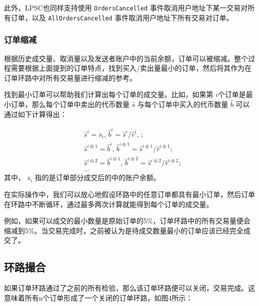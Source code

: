 \documentclass[UTF8]{ctexart}
\makeatletter
\newenvironment{figurehere}
 {\def\@captype{figure}}
 {}
\makeatother
\begin{document}
\begin{multicols}{2}
此外，LPSC也同样支持使用 \verb|OrdersCancelled| 事件取消用户地址下某一交易对所有订单，以及 \verb|AllOrdersCancelled| 事件取消用户地址下所有交易对订单。


\subsubsection{订单缩减\label{sec:order_scaling}}
根据历史成交量、取消量以及发送者账户中的当前余额，订单可以被缩减。整个过程需要根据上面提到的订单特点，找到买入/卖出量最小的订单，然后将其作为在订单环路中对所有交易量进行缩减的参考。

找到最小订单可以帮助我们计算出每个订单的成交量。比如，如果第 $i$个订单是最小订单，那么每个订单中卖出的代币数量 $\hat{s}$ 与每个订单中买入的代币数量 $\hat{b}$ 可以通过如下计算得出：

\[
\begin{split}
&\hat{s}^{i}=\overline{s}_i\text{, } \hat{b}^{i}=\hat{s}^{i}/ \hat{r}^i\text{, }\text{;}\\
&\hat{s}^{i\oplus 1}=\hat{b}^i\text{, } \hat{b}^{i\oplus 1}=\hat{s}^{i\oplus 1}/ \hat{r}^{i\oplus 1}\text{;}\\
&\hat{s}^{i\oplus 2}=\hat{b}^{i\oplus 1}\text{, } \hat{b}^{i\oplus 2}=\hat{s}^{i\oplus 2}/ \hat{r}^{i\oplus 2}\text{;}\\
& ...
\end{split}
\]
其中， $\overline{s}_i$ 指的是订单部分成交后的中的账户余额。

在实际操作中，我们可以放心地假设环路中的任意订单都具有最小订单，然后订单在环路中不断循环，通过最多两次计算就能得到每个订单的成交量。

例如，如果可以成交的最小数量是原始订单的5\%，订单环路中的所有交易量便会缩减到5\%。当交易完成时，之前被认为是待成交数量最小的订单应该已经完全成交了。

\subsection{环路撮合\label{sec:settlement}}

如果订单环路通过了之前的所有检验，那么该订单环路便可以关闭，交易完成。这意味着所有n个订单形成了一个关闭的订单环路，如图4所示：

\begin{center}
\begin{figurehere}
\centering
\begin{tikzpicture}[
circle/.style={
		scale=0.75,
		rounded corners,
		draw=black, 
		text centered,
		}
]


\end{tikzpicture}
\end{figurehere}
\end{center}
\end{multicols}
\end{document}
